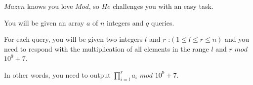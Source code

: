 $Mazen$ knows you love $Mod$, so $He$ challenges you with an easy task.

You will be given an array $a$ of $n$ integers and $q$ queries.

For each query, you will be given two integers $l$ and $r$ :$(1\le l \le r \le n)$ and you need to respond with the multiplication of all elements in the range $l$ and $r$ $mod$ $10^9+7$.

In other words, you need to output $ {\prod_{i=l}^r a_i}$ $mod$ $10^9+7$.
